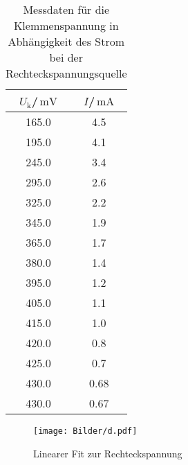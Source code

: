 \begin{table}
  \centering
  \caption{Messdaten für die Klemmenspannung in Abhängigkeit des Strom bei der Rechteckspannungsquelle}
  \label{tab:reckteck}
\begin{tabular}{cc}
  \toprule
$U_\text{k}$/$\,\si{\milli\volt}$ & $I$/$\,\si{\milli\ampere}$\\
\midrule
165.0 & 4.5 \\
195.0 & 4.1 \\
245.0 & 3.4 \\
295.0 & 2.6 \\
325.0 & 2.2 \\
345.0 & 1.9 \\
365.0 & 1.7 \\
380.0 & 1.4 \\
395.0 & 1.2 \\
405.0 & 1.1 \\
415.0 & 1.0 \\
420.0 & 0.8 \\
425.0 & 0.7 \\
430.0 & 0.68 \\
430.0 & 0.67 \\
\bottomrule
\end{tabular}
\end{table}
\begin{figure}
\texttt{[image: Bilder/d.pdf]}
\caption{Linearer Fit zur Rechteckspannung}
\label{fig:plot_rechteck}
\end{figure}

